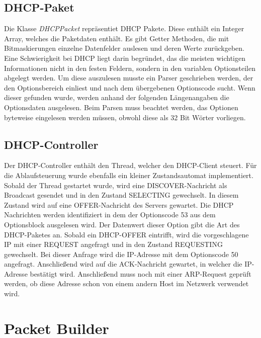\subsection{DHCP-Paket}
Die Klasse \textit{DHCPPacket} repräsentiet DHCP Pakete. Diese enthält ein Integer Array, welches die Paketdaten enthält. Es gibt Getter Methoden, die mit Bitmaskierungen einzelne Datenfelder auslesen und deren Werte zurückgeben. Eine Schwierigkeit bei DHCP liegt darin begründet, das die meisten wichtigen Informationen nicht in den festen Feldern, sondern in den variablen Optionsteilen abgelegt werden. Um diese auszulesen musste ein Parser geschrieben werden, der den Optionsbereich einliest und nach dem übergebenen Optionscode sucht. Wenn dieser gefunden wurde, werden anhand der folgenden Längenangaben die Optionsdaten ausgelesen. Beim Parsen muss beachtet werden, das Optionen byteweise eingelesen werden müssen, obwohl diese als 32 Bit Wörter vorliegen. 

\subsection{DHCP-Controller}

Der DHCP-Controller enthält den Thread, welcher den DHCP-Client steuert. Für die Ablaufsteuerung wurde ebenfalls ein kleiner Zustandsautomat implementiert. Sobald der Thread gestartet wurde, wird eine DISCOVER-Nachricht als Broadcast gesendet und in den Zustand SELECTING gewechselt. In diesem Zustand wird auf eine OFFER-Nachricht des Servers gewartet. Die DHCP Nachrichten werden identifiziert in dem der Optionscode 53 aus dem Optionsblock ausgelesen wird. Der Datenwert dieser Option gibt die Art des DHCP-Paketes an. Sobald ein DHCP-OFFER eintrifft, wird die vorgeschlagene IP mit einer REQUEST angefragt und in den Zustand REQUESTING gewechselt. Bei dieser Anfrage wird die IP-Adresse mit dem Optionscode 50 angefragt. Anschließend wird auf die ACK-Nachricht gewartet, in welcher die IP-Adresse bestätigt wird. Anschließend muss noch mit einer ARP-Request geprüft werden, ob diese Adresse schon von einem andern Host im Netzwerk verwendet wird. 

\section{Packet Builder}

